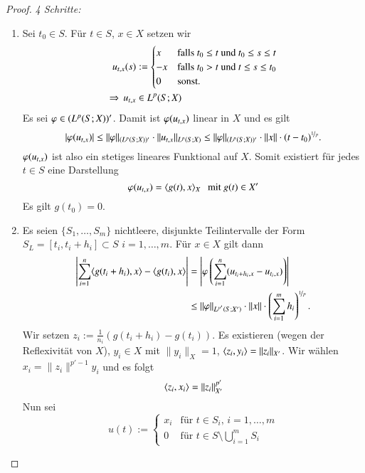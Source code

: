 \begin{proof}
    \textit{4 Schritte:}
    \begin{enumerate}
        \item %
        Sei $t_0\in S$. Für $t\in S$, $x\in X$ setzen wir
        \begin{align*}
            u_{t,x}(s) &:= \begin{cases} x & \text{falls $t_0\leq t$ und $t_0\leq s \leq t$}\\
                        -x & \text{falls $t_0>t$ und $t\leq s \leq t_0$} \\
                        0 & \text{sonst}.\end{cases}\\
            \Rightarrow \, u_{t,x} &\in L^p (S;X)
        \end{align*}
        Es sei $\varphi\in (L^p(S;X))'$. Damit ist $\varphi(u_{t,x})$ linear in $X$ und es gilt
        \[
            |\varphi(u_{t,x})|\leq \|\varphi\|_{(L^p(S;X))'} \cdot\|u_{t,x}\|_{L^p(S;X)} \leq \|\varphi\|
            _{(L^p(S;X))'} \cdot \|x\|\cdot (t-t_0)^{\nicefrac1p}.
        \]
        $\varphi(u_{t,x})$ ist also ein stetiges lineares Funktional auf $X$. Somit existiert für jedes
        $t\in S$ eine Darstellung
        \[
            \varphi(u_{t,x})= \langle g(t),x\rangle _X \hspace{.25cm} \text{mit } g(t)\in X'
        \]
        Es gilt $g(t_0)=0$.
        \item %
        Es seien $\{S_1,…,S_m\}$ nichtleere, disjunkte Teilintervalle der Form $S_L=[t_i,t_i+h_i]\subset
        S$ $i=1,…,m$. Für $x\in X$ gilt dann
        \begin{align*}
            \left|\sum_{i=1}^n\langle g(t_i+h_i),x\rangle-\langle g(t_i),x\rangle\right|&= \left| \varphi
            \left( \sum_{i=1}^n (u_{t_i+h_i,x}-u_{t_i,x}) \right) \right|\\
                &\leq \|\varphi\|_{L^{p'}(S;X')}\cdot\|x\|\cdot\left(\sum_{i=1}^m h_i\right)^{\nicefrac1p}.
        \end{align*}
        Wir setzen $z_i:= \frac{1}{n_i}(g(t_i+h_i)-g(t_i))$. Es existieren (wegen der Reflexivität von
        $X$), $y_i\in X$ mit $\|y_i\|_X=1$, $\langle z_i,y_i\rangle = \|z_i\|_{X'}$. Wir wählen
        $x_i=\|z_i\|^{p'-1} y_i$ und es folgt
        \[
            \langle z_i,x_i \rangle = \|z_i\|^{p'}_{X'}
        \]
        Nun sei
        \[
            u(t):= \begin{cases} x_i & \text{für $t\in S_i$, $i=1,…,m$} \\
                   0 & \text{für } t\in S\setminus\bigcup_{i=1}^m S_i\end{cases}
\]
\end{enumerate}
\end{proof}

